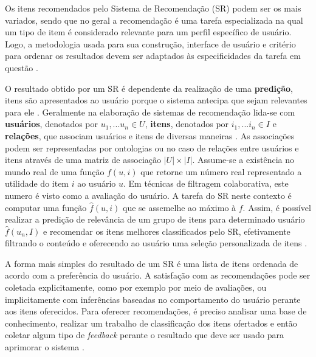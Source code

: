 \documentclass[12pt]{article}
\begin{document}
Os itens recomendados pelo Sistema de Recomendação (SR) podem ser os mais variados, sendo que no geral a recomendação é uma tarefa especializada na qual um tipo de item é considerado relevante para um perfil específico de usuário. Logo, a metodologia usada para sua construção, interface de usuário e critério para ordenar os resultados devem ser adaptados às especificidades da tarefa em questão \cite{ricci2011introduction}. 

O resultado obtido por um SR é dependente da realização de uma \textbf{predição}, itens são apresentados ao usuário porque o sistema antecipa que sejam relevantes para ele \cite{ricci2011introduction}. Geralmente na elaboração de sistemas de recomendação lida-se com \textbf{usuários}, denotados por $ u_1, ... u_n \in U $, \textbf{itens}, denotados por $ i_1, ... i_n \in I$  e \textbf{relações}, que associam usuários e itens de diversas maneiras \cite{ekstrand2019recommender}. As associações podem ser representadas por ontologias \cite{primo2006tecnicas} ou no caso de relações entre usuários e itens através de uma matriz de associação $ |U| \times |I| $. Assume-se a existência no mundo real de uma função $ f (u, i) $ que retorne um número real representado a utilidade do item $i$ ao usuário $u$. Em técnicas de filtragem colaborativa, este numero é visto como a avaliação do usuário. A tarefa do SR neste contexto é computar uma função $\hat{f}(u, i)$ que se assemelhe ao máximo à $f$. Assim, é possível realizar a predição de relevância de um grupo de itens para determinado usuário $\hat{f}(u_n, I)$ e recomendar os itens melhores classificados pelo SR, efetivamente filtrando o conteúdo e oferecendo ao usuário uma seleção personalizada de itens \cite{ricci2011introduction}.

A forma mais simples do resultado de um SR é uma lista de itens ordenada de acordo com a preferência do usuário. A satisfação com as recomendações pode ser coletada explicitamente, como por exemplo por meio de avaliações, ou implicitamente com inferências baseadas no comportamento do usuário perante aos itens oferecidos. Para oferecer recomendações, é preciso analisar  uma base de conhecimento, realizar um trabalho de classificação dos itens ofertados e então coletar algum tipo de \textit{feedback} perante o resultado que deve ser usado para aprimorar o sistema \cite{shani2011evaluating}.
\end{document}
